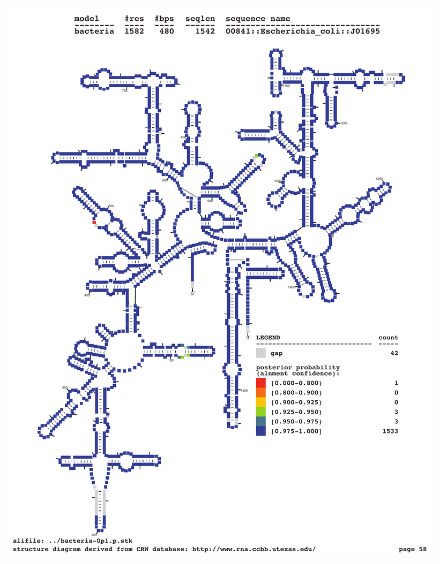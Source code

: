 \begin{figure}[h]
\includegraphics[height=8.5in]{Figures/ecoli-prob}
\label{fig:ecoli-prob}
\end{figure}




